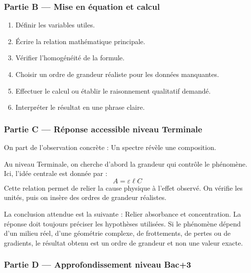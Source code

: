 \documentclass[11pt,a4paper]{article}
\begin{document}
\subsubsection*{Partie B — Mise en équation et calcul}

\begin{enumerate}
  \item Définir les variables utiles.
  \item Écrire la relation mathématique principale.
  \item Vérifier l'homogénéité de la formule.
  \item Choisir un ordre de grandeur réaliste pour les données manquantes.
  \item Effectuer le calcul ou établir le raisonnement qualitatif demandé.
  \item Interpréter le résultat en une phrase claire.
\end{enumerate}

\subsubsection*{Partie C — Réponse accessible niveau Terminale}

\begin{corrigebox}
On part de l'observation concrète : Un spectre révèle une composition.

Au niveau Terminale, on cherche d'abord la grandeur qui contrôle le phénomène. Ici, l'idée centrale est donnée par :
\[
A=\varepsilon\ell C
\]
Cette relation permet de relier la cause physique à l'effet observé. On vérifie les unités, puis on insère des ordres de grandeur réalistes.

La conclusion attendue est la suivante : Relier absorbance et concentration. La réponse doit toujours préciser les hypothèses utilisées. Si le phénomène dépend d'un milieu réel, d'une géométrie complexe, de frottements, de pertes ou de gradients, le résultat obtenu est un ordre de grandeur et non une valeur exacte.
\end{corrigebox}

\subsubsection*{Partie D — Approfondissement niveau Bac+3}
\end{document}
